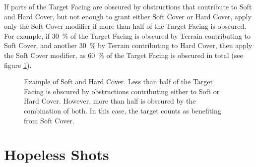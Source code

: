 If parts of the Target Facing are obscured by obstructions that contribute to Soft and Hard Cover, but not enough to grant either Soft Cover or Hard Cover, apply only the Soft Cover modifier if more than half of the Target Facing is obscured. For example, if \SI{30}{\percent} of the Target Facing is obscured by Terrain contributing to Soft Cover, and another \SI{30}{\percent} by Terrain contributing to Hard Cover, then apply the Soft Cover modifier, as \SI{60}{\percent} of the Target Facing is obscured in total (see figure \ref{figure/soft_and_hard_cover}).

\newcommand{\figureSHCHeightLarge}{\normalfontsize{Height: Large}}
\newcommand{\figureSHCHeightStandard}{\normalfontsize{Height: Standard}}
\newcommand{\figureSHCLessthanhalffromhardcover}{\normalfontsize{Less than half of the Target Facing is in Hard Cover}}
\newcommand{\figureSHCLessthanhalffromsoftcover}{%
	\begin{minipage}{0.3\unitlength}\begin{center}%
	\normalfontsize{Less than half of the Target Facing is in Soft Cover}%
	\end{center}\end{minipage}%
}
\newcommand{\figureSHCMorethanhalftotal}{%
	\begin{minipage}{0.23\unitlength}\begin{center}%
	\normalfontsize{{More than half of the total Target Facing is in Cover}}%
	\end{center}\end{minipage}%
}

\begin{figure}[H]%
	\begin{minipage}{0.55\textwidth}
	\renewcommand{\figbiglettersize}{22}
	\def\svgwidth{\textwidth}
	
	\end{minipage}\hfill\begin{minipage}[b]{0.42\textwidth}
	\caption{Example of Soft and Hard Cover.\captionpar
	Less than half of the Target Facing is obscured by obstructions contributing either to Soft or Hard Cover. However, more than half is obscured by the combination of both. In this case, the target counts as benefiting from Soft Cover.}
	\label{figure/soft_and_hard_cover}
	\end{minipage}
\end{figure}

\section{Hopeless Shots}
\label{hopeless_shots}

